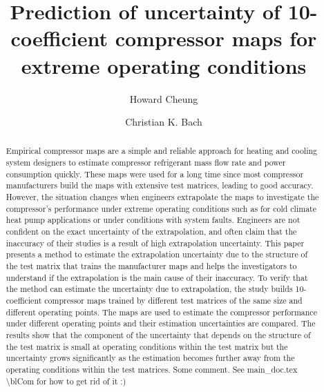 \documentclass[a4paper]{jpconf}
\newcommand{\blCom}[1]{\begingroup\sffamily\color{blue} #1 \endgroup}  %
\begin{document}
\title{Prediction of uncertainty of 10-coefficient compressor maps for extreme operating conditions}

\author{Howard Cheung}

\address{Postdoctoral Research Fellow, Ray W. Herrick Laboratories, School of Mechanical Engineering, Purdue University, 177 S. Russell St., West Lafayette, IN 47907-2031, US}


\author{Christian K. Bach}

\address{Assistant Professor, Mechanical and Aerospace Engineering, Oklahoma State University, 218 Engineering North, Stillwater, OK 74078-5016}


\begin{abstract}
Empirical compressor maps are a simple and reliable approach for heating and cooling system designers to estimate compressor refrigerant mass flow rate and power consumption quickly. These maps were used for a long time since most compressor manufacturers build the maps with extensive test matrices, leading to good accuracy. However, the situation changes when engineers extrapolate the maps to investigate the compressor's performance under extreme operating conditions such as for cold climate heat pump applications or under conditions with system faults.  Engineers are not confident on the exact uncertainty of the extrapolation, and often claim that the inaccuracy of their studies is a result of high extrapolation uncertainty. This paper presents a method to estimate the extrapolation uncertainty due to the structure of the test matrix that trains the manufacturer maps and helps the investigators to understand if the extrapolation is the main cause of their inaccuracy. To verify that the method can estimate the uncertainty due to extrapolation, the study builds 10-coefficient compressor maps trained by different test matrices of the same size and different operating points. The maps are used to estimate the compressor performance under different operating points and their estimation uncertainties are compared. The results show that the component of the uncertainty that depends on the structure of the test matrix is small at operating conditions within the test matrix but the uncertainty grows significantly as the estimation becomes further away from the operating conditions within the test matrices.\blCom{Some comment.  See main\_doc.tex \textbackslash blCom for how to get rid of it :)}
\end{abstract}
\end{document}
